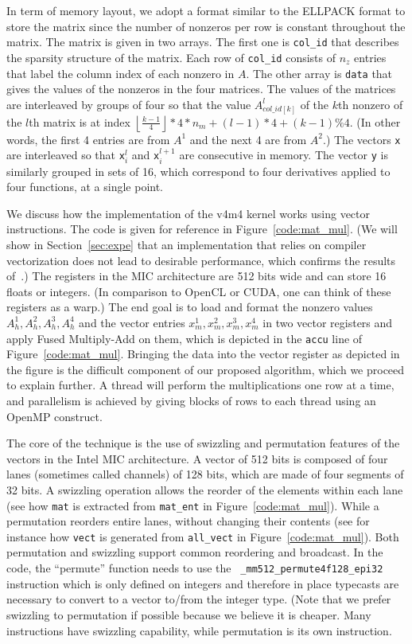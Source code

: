 \documentclass[10pt,conference,compsocconf]{IEEEtran}
\newcommand{\floor}[1]{\left\lfloor#1\right\rfloor}
\begin{document}
In term of memory layout, we adopt a format similar to the ELLPACK
format to store the matrix since the number of nonzeros per row is
constant throughout the matrix. The matrix is given in two arrays. The
first one is {\tt col\_id} that describes the
sparsity structure of the matrix. Each row of {\tt col\_id} consists
of $n_z$ entries that label the column index of each nonzero in
$A$. The other array is  {\tt data} that gives the values of
the nonzeros in the four matrices. The values of the matrices are
interleaved by groups of four so that the value $A^l_{col\_id[k]}$ of
the $k$th nonzero of the $l$th matrix is at index $\floor{\frac{k-1}{4}}*4*n_m + (l-1)*4+(k-1)\%4$.
(In other words, the first 4 entries are from $A^{1}$ and the next 4 are from $A^2$.) The vectors {\tt x} are
interleaved so that {\tt x}$^l_i$ and {\tt x}$^{l+1}_i$ are
consecutive in memory. The vector {\tt y} is similarly 
grouped in sets of 16, which correspond to four derivatives applied to
four functions, at a single point.


We discuss how the implementation of the v4m4 kernel works using
vector instructions. The code is given for reference in
Figure~\ref{code:mat_mul}. (We will show in Section~\ref{sec:expe}
that an implementation that relies on compiler vectorization does not lead
to desirable performance, which confirms the results
of~\cite{Saule13-ARXIV}.) The registers in the MIC architecture are
512 bits wide and can store 16 floats or integers. (In comparison to
OpenCL or CUDA, one can think of these registers as a warp.) The end
goal is to load and format the nonzero values $A_h^1,A_h^2,A_h^3,A_h^4$
and the vector entries $x_m^1,x_m^2,x_m^3,x_m^4$ in two vector registers and 
apply Fused Multiply-Add on them, which is depicted in the {\tt accu} line of 
Figure~\ref{code:mat_mul}. Bringing the data into the vector
register as depicted in the figure is the difficult component of our 
proposed algorithm, which we proceed to explain further. 
A thread will perform the multiplications one row at a time,
and parallelism is achieved by giving blocks of rows to each thread
using an OpenMP construct.


The core of the technique is the use of swizzling and permutation
features of the vectors in the Intel MIC architecture. A vector of 512
bits is composed of four lanes (sometimes called channels) of 128
bits, which are made of four segments of 32 bits. A swizzling
operation allows the reorder of the elements within each lane (see how
{\tt mat} is extracted from {\tt mat\_ent} in
Figure~\ref{code:mat_mul}). While a permutation reorders entire lanes,
without changing their contents (see for instance how {\tt vect} is
generated from {\tt all\_vect} in Figure~\ref{code:mat_mul}).  Both
permutation and swizzling support common reordering and broadcast. In
the code, the ``permute'' function needs to use the {\tt
  \_mm512\_permute4f128\_epi32} instruction which is only defined on
integers and therefore in place typecasts are necessary to convert to
a vector to/from the integer type.  (Note that we prefer swizzling to
permutation if possible because we believe it is cheaper. Many
instructions have swizzling capability, while permutation is its own
instruction. 
\end{document}
